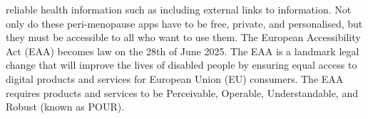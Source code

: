 reliable health information such as including external links to information. Not only do these peri-menopause apps have to be free, private, and personalised, but they must be accessible to all who want to use them. The European Accessibility Act (EAA) becomes law on the 28th of June 2025. The EAA is a landmark legal change that will improve the lives of disabled people by ensuring equal access to digital products and services for European Union (EU) consumers\cite{AbilityNet2024}. The EAA requires products and services to be Perceivable, Operable, Understandable, and Robust (known as POUR). 
